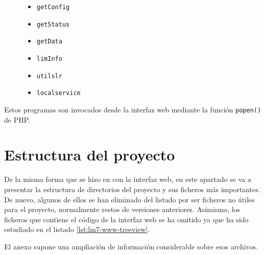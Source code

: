 \begin{figure}[ht]
    \begin{minipage}[b]{.45\textwidth}
        \begin{itemize}
            \item \verb|getConfig|
            \item \verb|getStatus|
            \item \verb|getData|
        \end{itemize}
    \end{minipage}
    \hfill
    \begin{minipage}[b]{.45\textwidth}
        \begin{itemize}
            \item \verb|limInfo|
            \item \verb|utilslr|
            \item \verb|localservice|
        \end{itemize}
    \end{minipage}
\end{figure}

Estos programas son invocados desde la interfaz web mediante la función \verb|popen()| de PHP.

\section{Estructura del proyecto}

De la misma forma que se hizo en con la interfaz web, en este apartado se va a presentar la estructura de directorios del proyecto y sus ficheros más importantes. De nuevo, algunos de ellos se han eliminado del listado por ser ficheros no útiles para el proyecto, normalmente restos de versiones anteriores. Asimismo, los ficheros que contiene el código de la interfaz web se ha omitido ya que ha sido estudiado en el listado \ref{lst:lm7-www-treeview}.

El anexo  supone una ampliación de información considerable sobre esos archivos. \\

